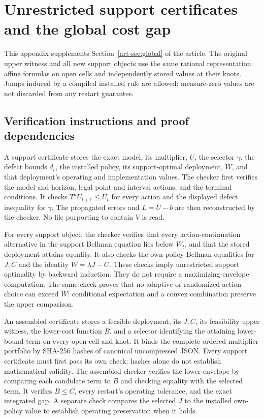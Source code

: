 \section{Unrestricted support certificates and the global cost gap}\label{app:global}
This appendix supplements Section~\ref{art-sec:global} of the article. The original upper witness and all new support objects use the same rational representation: affine formulas on open cells and independently stored values at their knots. Jumps induced by a compiled installed rule are allowed; measure-zero values are not discarded from any restart guarantee.

\subsection{Verification instructions and proof dependencies}
A support certificate stores the exact model, its multiplier, $U$, the selector $\gamma$, the defect bounds $d_t$, the installed policy, its support-optimal deployment, $W$, and that deployment's operating and implementation values. The checker first verifies the model and horizon, legal point and interval actions, and the terminal conditions. It checks $T^aU_{t+1}\le U_t$ for every action and the displayed defect inequality for $\gamma$. The propagated errors and $L=U-b$ are then reconstructed by the checker. No file purporting to contain $V$ is read.

For every support object, the checker verifies that every action-continuation alternative in the support Bellman equation lies below $W_t$, and that the stored deployment attains equality. It also checks the own-policy Bellman equalities for $J,C$ and the identity $W=\lambda J-C$. These checks imply unrestricted support optimality by backward induction. They do not require a maximizing-envelope computation. The same check proves that no adaptive or randomized action choice can exceed $W$: conditional expectation and a convex combination preserve the upper comparison.

An assembled certificate stores a feasible deployment, its $J,C$, its feasibility upper witness, the lower-cost function $B$, and a selector identifying the attaining lower-bound term on every open cell and knot. It binds the complete ordered multiplier portfolio by SHA-256 hashes of canonical uncompressed JSON. Every support certificate must first pass its own check; hashes alone do not establish mathematical validity. The assembled checker verifies the lower envelope by comparing each candidate term to $B$ and checking equality with the selected term. It verifies $B\le C$, every restart's operating tolerance, and the exact integrated gap. A separate check compares the selected $J$ to the installed own-policy value to establish operating preservation when it holds.

